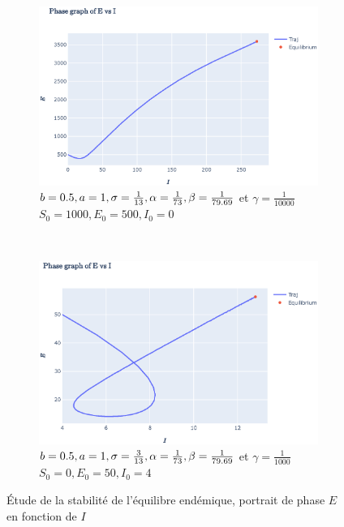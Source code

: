 \documentclass[11pt]{article}
\begin{document}
\begin{figure}[hb]
\centering
\begin{subfigure}{0.49\textwidth}
  \centering
  \includegraphics[width=\linewidth]{../figures/study_Endemic_stabillity_1.eps}  
  \caption{$b =0.5, a = 1, \sigma = \frac{1}{13}, \alpha = \frac{1}{73}, \\\beta = \frac{1}{79.69}$ et $\gamma = \frac{1}{10000}$ \\
  $S_0 = 1000, E_0 = 500, I_0 = 0$}
  \label{fig:endemic stability 1}
\end{subfigure}\
\begin{subfigure}{0.49\textwidth}
  \centering
  \includegraphics[width=\linewidth]{../figures/study_Endemic_stabillity_2.eps}
  \caption{$b =0.5, a = 1, \sigma = \frac{3}{13}, \alpha = \frac{1}{73}, \\\beta = \frac{1}{79.69}$ et $\gamma = \frac{1}{1000}$ \\
  $S_0 = 0, E_0 = 50, I_0 = 4$}
  \label{fig:endemic stability 2}
\end{subfigure}
\caption{\'Etude de la stabilit\'e de l'\'equilibre end\'emique, portrait de phase $E$ en fonction de $I$}
\label{fig:endemic stability}
\end{figure}
\end{document}
